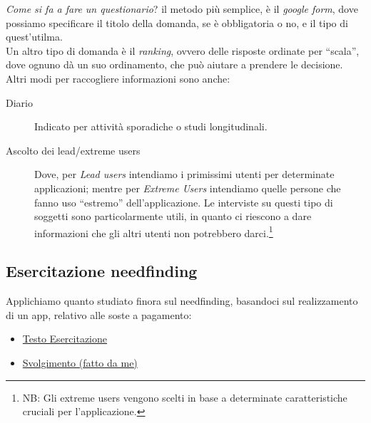 \documentclass[oneside]{book}
\begin{document}
			\emph{Come si fa a fare un questionario}? il metodo più semplice, è il \emph{google form}, dove possiamo specificare il titolo della domanda, se è obbligatoria o no, e il tipo di quest'utilma.\\

			Un altro tipo di domanda è il \emph{ranking}, ovvero delle risposte ordinate per ``scala'', dove ognuno dà un suo ordinamento, che può aiutare a prendere le decisione. \\

			Altri modi per raccogliere informazioni sono anche:
			\begin{description}
			\item[Diario] Indicato per attività sporadiche o studi longitudinali. 
			\item[Ascolto dei lead/extreme users] Dove, per \emph{Lead users} intendiamo i primissimi utenti per determinate applicazioni; mentre per \emph{Extreme Users} intendiamo quelle persone che fanno uso ``estremo'' dell'applicazione. Le interviste su questi tipo di soggetti sono particolarmente utili, in quanto ci riescono a dare informazioni che gli altri utenti non potrebbero darci.\footnote{ NB: Gli extreme users vengono scelti in base a determinate caratteristiche cruciali per l'applicazione.}
			\end{description}

		\subsection{Esercitazione needfinding}
			Applichiamo quanto studiato finora sul needfinding, basandoci sul realizzamento di un app, relativo alle soste a pagamento:
			\begin{itemize}
			\item \href{https://dl.dropboxusercontent.com/u/20679042/IUM%202015-2016/Esercitazione%20needfinding%202015.pdf}{Testo Esercitazione}
			\item \href{https://alexflyce.files.wordpress.com/2016/02/esercitazione-sviluppo-applicazione-sosta1.pdf}{Svolgimento (fatto da me)}
			\end{itemize}
\end{document}
